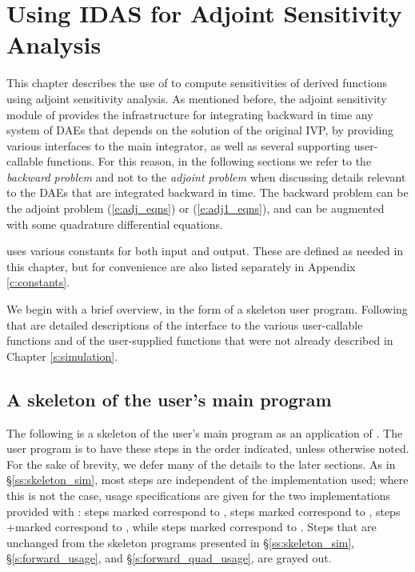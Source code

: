\chapter{Using IDAS for Adjoint Sensitivity Analysis}\label{s:adjoint}

This chapter describes the use of {\idas} to compute sensitivities of derived 
functions using adjoint sensitivity analysis. As mentioned before, the adjoint
sensitivity module of {\idas} provides the infrastructure for integrating
backward in time any system of DAEs that depends on the solution of the original
IVP, by providing various interfaces to the main {\idas} integrator, as well 
as several supporting user-callable functions. For this reason, in the following
sections we refer to the {\em backward problem} and not to the 
{\em adjoint problem} when discussing details relevant to the DAEs that
are integrated backward in  time. The backward problem can be the adjoint problem
(\ref{e:adj_eqns}) or (\ref{e:adj1_eqns}), and
can be augmented with some quadrature differential equations.

{\idas} uses various constants for both input and output.  These are
defined as needed in this chapter, but for convenience are also listed
separately in Appendix \ref{c:constants}.

We begin with a brief overview, in the form of a skeleton user program.
Following that are detailed descriptions of the interface to the
various user-callable functions and of the user-supplied functions that were
not already described in Chapter \ref{s:simulation}.

\section{A skeleton of the user's main program}
\label{ss:skeleton_adj}

The following is a skeleton of the user's main program as an application of
{\idas}. The user program is to have these steps in the order indicated, 
unless otherwise noted. For the sake of brevity, we defer many of the details to 
the later sections.
As in \S\ref{ss:skeleton_sim}, most steps are independent of the {\nvector}
implementation used; where this is not the case, usage specifications are given for
the two implementations provided with {\idas}: steps marked {\p} correspond to 
{\nvecp}, steps marked {\omp} correspond to {\nvecopenmp}, steps
+marked {\pt} correspond to {\nvecpthreads}, while steps marked {\s}
correspond to {\nvecs}. 
Steps that are unchanged from the skeleton programs presented in
\S\ref{ss:skeleton_sim}, \S\ref{s:forward_usage}, and \S\ref{s:forward_quad_usage},
are grayed out.

